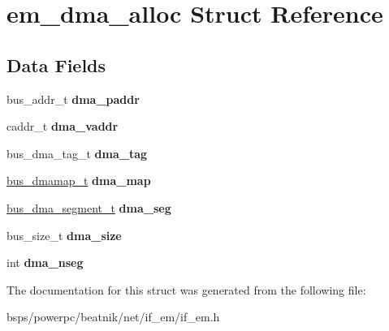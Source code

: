 \hypertarget{structem__dma__alloc}{}\section{em\+\_\+dma\+\_\+alloc Struct Reference}
\label{structem__dma__alloc}
\subsection*{Data Fields}
\begin{DoxyCompactItemize}
\item 
\mbox{\label{structem__dma__alloc_aeb189b51cf829c2896adab5c486a345d}} 
bus\+\_\+addr\+\_\+t {\bfseries dma\+\_\+paddr}
\item 
\mbox{\label{structem__dma__alloc_a1907937df07663d8f47fe532e2d6cd4e}} 
caddr\+\_\+t {\bfseries dma\+\_\+vaddr}
\item 
\mbox{\label{structem__dma__alloc_a9e188bbca926f227f56cb60bc7fdeb01}} 
bus\+\_\+dma\+\_\+tag\+\_\+t {\bfseries dma\+\_\+tag}
\item 
\mbox{\label{structem__dma__alloc_a744d87ac52ebac4be3aaea46b60bc507}} 
\mbox{\hyperlink{structgfe__dmamem}{bus\+\_\+dmamap\+\_\+t}} {\bfseries dma\+\_\+map}
\item 
\mbox{\label{structem__dma__alloc_a7ea55c105283c01b309bdcf784bcfa70}} 
\mbox{\hyperlink{structbus__dma__segment__t}{bus\+\_\+dma\+\_\+segment\+\_\+t}} {\bfseries dma\+\_\+seg}
\item 
\mbox{\label{structem__dma__alloc_a0ba92fb78b64e00c7c4dbb860c3bbc63}} 
bus\+\_\+size\+\_\+t {\bfseries dma\+\_\+size}
\item 
\mbox{\label{structem__dma__alloc_a5828161bf1e305f830bc3eebba6a5e98}} 
int {\bfseries dma\+\_\+nseg}
\end{DoxyCompactItemize}


The documentation for this struct was generated from the following file\+:\begin{DoxyCompactItemize}
\item 
bsps/powerpc/beatnik/net/if\+\_\+em/if\+\_\+em.\+h\end{DoxyCompactItemize}
